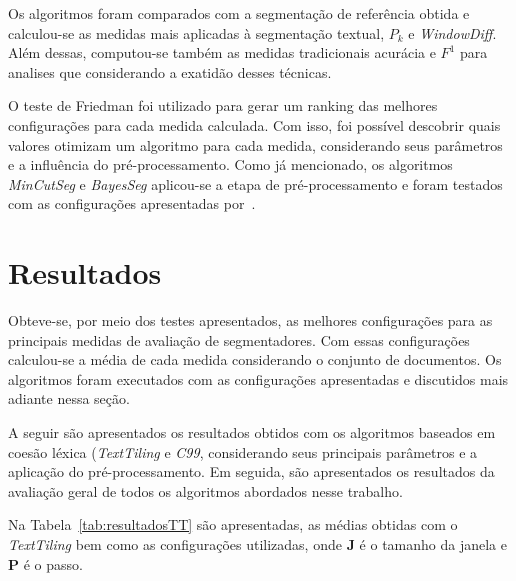 Os algoritmos foram comparados com a segmentação de referência obtida e calculou-se as medidas mais aplicadas à segmentação textual, $P_k$ e \textit{WindowDiff}. Além dessas, computou-se também as medidas tradicionais acurácia e $F^1$ para analises que considerando a exatidão desses técnicas.

O teste de Friedman foi utilizado para gerar um ranking das melhores configurações para cada medida calculada. Com isso, foi possível descobrir quais valores otimizam um algoritmo para cada medida, considerando seus parâmetros e a influência do pré-processamento. Como já mencionado, os algoritmos \textit{MinCutSeg} e \textit{BayesSeg} aplicou-se a etapa de pré-processamento e foram testados com as configurações apresentadas por~\cite{Eis2008}. 



\section{Resultados}

Obteve-se, por meio dos testes apresentados, as melhores configurações para as principais medidas de avaliação de segmentadores. Com essas configurações calculou-se a média de cada medida considerando o conjunto de documentos. Os algoritmos foram executados com as configurações apresentadas e discutidos mais adiante nessa seção.

A seguir são apresentados os resultados obtidos com os algoritmos baseados em coesão léxica (\textit{TextTiling} e \textit{C99}, considerando seus principais parâmetros e a aplicação do pré-processamento. Em seguida, são apresentados os resultados da avaliação geral de todos os algoritmos abordados nesse trabalho.

Na Tabela~\ref{tab:resultadosTT} são apresentadas, as médias obtidas com o \textit{TextTiling} bem como as configurações utilizadas, onde \textbf{J} é o tamanho da janela e \textbf{P} é o passo.

